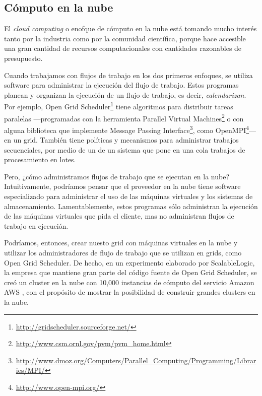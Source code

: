 \documentclass[letterpaper]{report}
\begin{document}
\subsection*{Cómputo en la nube}

El \emph{cloud computing} o enofque de cómputo en la nube está tomando mucho interés tanto por la industria como por la comunidad científica, porque hace accesible una gran cantidad de recursos computacionales con cantidades razonables de presupuesto.

Cuando trabajamos con flujos de trabajo en los dos primeros enfoques, se utiliza software para administrar la ejecución del flujo de trabajo. Estos programas planean y organizan la ejecución de un flujo de trabajo, es decir, \emph{calendarizan}. Por ejemplo, Open Grid Scheduler\footnote{\label{fn:note1}\url{http://gridscheduler.sourceforge.net/}} tiene algoritmos para distribuir tareas paralelas —programadas con la herramienta Parallel Virtual Machines\footnote{\url{http://www.csm.ornl.gov/pvm/pvm_home.html}} o con alguna biblioteca que implemente Message Passing Interface\footnote{ \url{http://www.dmoz.org/Computers/Parallel_Computing/Programming/Libraries/MPI/} }, como OpenMPI\footnote{ \url{http://www.open-mpi.org/} }— en un grid. También tiene políticas y mecanismos para administrar trabajos secuenciales, por medio de un de un sistema que pone en una cola trabajos de procesamiento en lotes.

Pero, ¿cómo administramos flujos de trabajo que se ejecutan en la nube? Intuitivamente, podríamos pensar que el proveedor en la nube tiene software especializado para administrar el uso de las máquinas virtuales y los sistemas de almacenamiento. Lamentablemente, estos programas sólo administran la ejecución de las máquinas virtuales que pida el cliente, mas no administran flujos de trabajo en ejecución. 

Podríamos, entonces, crear nuesto grid con máquinas virtuales en la nube y utilizar los administradores de flujo de trabajo que se utilizan en grids, como Open Grid Scheduler. De hecho, en un experimento elaborado por ScalableLogic, la empresa que mantiene gran parte del código fuente de Open Grid Scheduler, se creó un cluster en la nube con 10,000 instancias de cómputo del servicio Amazon AWS \cite{blog2012ogs}, con el propósito de mostrar la posibilidad de construir grandes clusters en la nube. 
\end{document}
